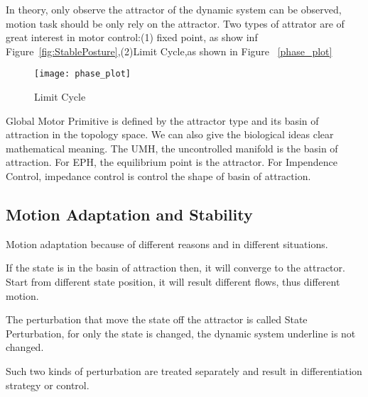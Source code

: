In theory, only observe the attractor of the dynamic system can be observed, motion task should be only rely on the attractor.
Two types of attrator are of great interest in motor control:(1) fixed point, as show inf Figure~\ref{fig:StablePosture},(2)Limit Cycle,as shown in Figure ~\ref{phase_plot}

\begin{figure}
\begin{center}
\texttt{[image: phase\_plot]}
\end{center}
\caption{Limit Cycle}
\label{fig:time_timeAttraction}
\end{figure}



Global Motor Primitive is defined by the attractor type and its basin of attraction in the topology space.
We can also give the biological ideas clear mathematical meaning.
The UMH, the uncontrolled manifold is the basin of attraction.
For EPH, the equilibrium point is the attractor.
For Impendence Control, impedance control is control the shape of basin of attraction.




\subsection{Motion Adaptation and Stability}
Motion adaptation because of different reasons and in different situations.

If the state is in the basin of attraction then, it will converge to the attractor. 
Start from different state position, it will result different flows, thus different motion.

The perturbation that move the state off the attractor is called State Perturbation, for only the state is changed, the dynamic system underline is not changed.

Such two kinds of perturbation are treated separately and result in differentiation strategy or control.

